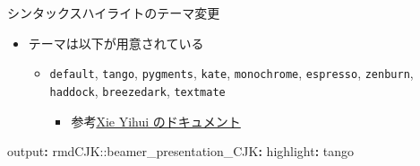 \documentclass[
  12pt,
  ignorenonframetext,
]{beamer}
\newenvironment{Shaded}{\begin{snugshade}}{\end{snugshade}}
\newcommand{\AttributeTok}[1]{\textcolor[rgb]{0.77,0.63,0.00}{#1}}
\newcommand{\FunctionTok}[1]{\textcolor[rgb]{0.00,0.00,0.00}{#1}}
\newcommand{\KeywordTok}[1]{\textcolor[rgb]{0.13,0.29,0.53}{\textbf{#1}}}
\providecommand{\tightlist}{%
  \setlength{\itemsep}{0pt}\setlength{\parskip}{0pt}}
\begin{document}
\begin{frame}[fragile]{シンタックスハイライトのテーマ変更}
\protect\hypertarget{ux30b7ux30f3ux30bfux30c3ux30afux30b9ux30cfux30a4ux30e9ux30a4ux30c8ux306eux30c6ux30fcux30deux5909ux66f4}{}

\begin{itemize}
\tightlist
\item
  テーマは以下が用意されている

  \begin{itemize}
  \tightlist
  \item
    \texttt{default}, \texttt{tango}, \texttt{pygments}, \texttt{kate},
    \texttt{monochrome}, \texttt{espresso}, \texttt{zenburn},
    \texttt{haddock}, \texttt{breezedark}, \texttt{textmate}

    \begin{itemize}
    \tightlist
    \item
      参考\href{https://bookdown.org/yihui/rmarkdown/html-document.html}{Xie
      Yihui のドキュメント}
    \end{itemize}
  \end{itemize}
\end{itemize}

\begin{Shaded}
\begin{Highlighting}[]
\FunctionTok{output}\KeywordTok{:}
\AttributeTok{  rmdCJK:}\FunctionTok{:beamer_presentation_CJK}\KeywordTok{:}
\AttributeTok{  }\FunctionTok{highlight}\KeywordTok{:}\AttributeTok{ tango}
\end{Highlighting}
\end{Shaded}

\end{frame}
\end{document}
